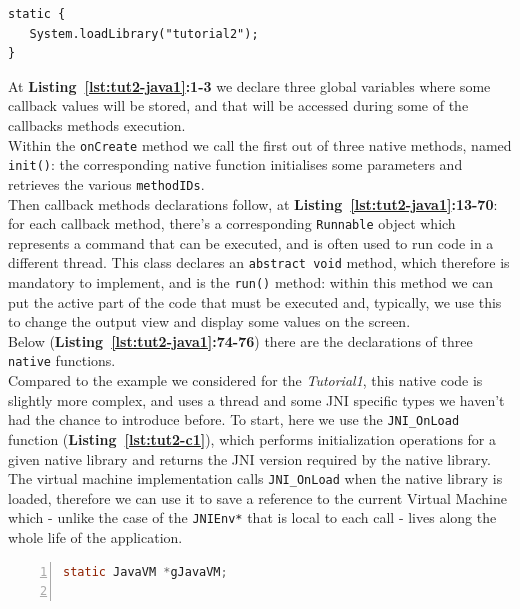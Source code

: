 \documentclass[a4paper,10pt]{article}
\newcommand{\keyword}[1]{\texttt{#1}}
\newcommand{\refl}[1]{\textbf{Listing~\ref{#1}}}
\begin{document}
\begin{multicols}{2}
\begin{lstlisting}
static {
   System.loadLibrary("tutorial2");
}
\end{lstlisting}
At \refl{lst:tut2-java1}\textbf{:1-3} we declare three global variables where
some callback values will be stored, and that will be accessed during some of
the callbacks methods execution.\\
Within the \keyword{onCreate} method we call the first out of three native
methods, named \keyword{init()}: the corresponding native function initialises
some parameters and retrieves the various \keyword{methodIDs}.\\
Then callback methods declarations follow, at
\refl{lst:tut2-java1}\textbf{:13-70}: for each callback method, there's a
corresponding \keyword{Runnable} object which represents a command that can be
executed, and is often used to run code in a different thread. This class
declares an \keyword{abstract void} method, which therefore is mandatory to
implement, and is the \keyword{run()} method: within this method we can put the
active part of the code that must be executed and, typically, we use this to
change the output view and display some values on the screen.\\
Below (\refl{lst:tut2-java1}\textbf{:74-76}) there are the declarations of three
\keyword{native} functions.\\
Compared to the example we considered for the \textit{Tutorial1}, this native
code is slightly more complex, and uses a thread and some JNI specific types we
haven't had the chance to introduce before. To start, here we use the
\keyword{JNI\_OnLoad} function (\refl{lst:tut2-c1}), which performs
initialization operations for a given native library and returns the JNI version
required by the native library. The virtual machine implementation calls
\keyword{JNI\_OnLoad} when the native library is loaded, therefore we can use it
to save a reference to the current Virtual Machine which - unlike the case of
the \keyword{JNIEnv*} that is local to each call - lives along the whole life of
the application.
\begin{lstlisting}[language=C,
		   columns=fullflexible,
		   showstringspaces=false,
		   xleftmargin=15pt,
		   frame = l,
		   numbers=left,
		   commentstyle=\color{gray}\upshape,
		   caption=Part of tutorial2.c - JNI\_OnLoad,
		   label=lst:tut2-c1]
static JavaVM *gJavaVM;				   
				   

\end{lstlisting}
\end{multicols}
\end{document}
